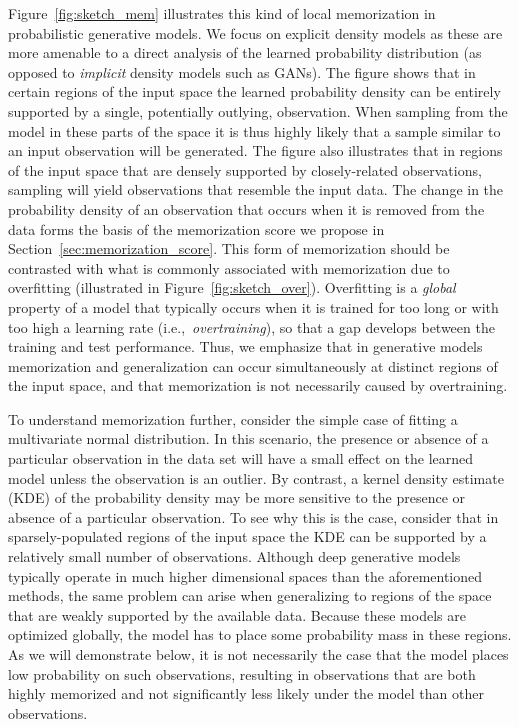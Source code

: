 \documentclass{article}
\begin{document}
Figure~\ref{fig:sketch_mem} illustrates this kind of local memorization in 
probabilistic generative models. We focus on explicit density models as these 
are more amenable to a direct analysis of the learned probability distribution 
(as opposed to \emph{implicit} density models such as GANs). The figure shows 
that in certain regions of the input space the learned probability density can 
be entirely supported by a single, potentially outlying, observation. When 
sampling from the model in these parts of the space it is thus highly likely 
that a sample similar to an input observation will be generated. The figure 
also illustrates that in regions of the input space that are densely supported 
by closely-related observations, sampling will yield observations that 
resemble the input data.  The change in the probability density of an 
observation that occurs when it is removed from the data forms the basis of 
the memorization score we propose in Section~\ref{sec:memorization_score}.  
This form of memorization should be contrasted with what is commonly 
associated with memorization due to overfitting (illustrated in 
Figure~\ref{fig:sketch_over}). Overfitting is a \emph{global} property of a 
model that typically occurs when it is trained for too long or with too high a 
learning rate (i.e.,~\emph{overtraining}), so that a gap develops between the 
training and test performance. Thus, we emphasize that in generative models 
memorization and generalization can occur simultaneously at distinct regions 
of the input space, and that memorization is not necessarily caused by 
overtraining.

To understand memorization further, consider the simple case of fitting a 
multivariate normal distribution. In this scenario, the presence or absence of 
a particular observation in the data set will have a small effect on the 
learned model unless the observation is an outlier. By contrast, a kernel 
density estimate (KDE) \cite{rosenblatt1956remarks,parzen1962estimation} of 
the probability density may be more sensitive to the presence or absence of a 
particular observation.  To see why this is the case, consider that in 
sparsely-populated regions of the input space the KDE can be supported by a 
relatively small number of observations. Although deep generative models 
typically operate in much higher dimensional spaces than the aforementioned 
methods, the same problem can arise when generalizing to regions of the space 
that are weakly supported by the available data. Because these models are 
optimized globally, the model has to place some probability mass in these 
regions. As we will demonstrate below, it is not necessarily the case that the 
model places low probability on such  observations, resulting in observations 
that are both highly memorized and not significantly less likely under the 
model than other observations.
\end{document}
